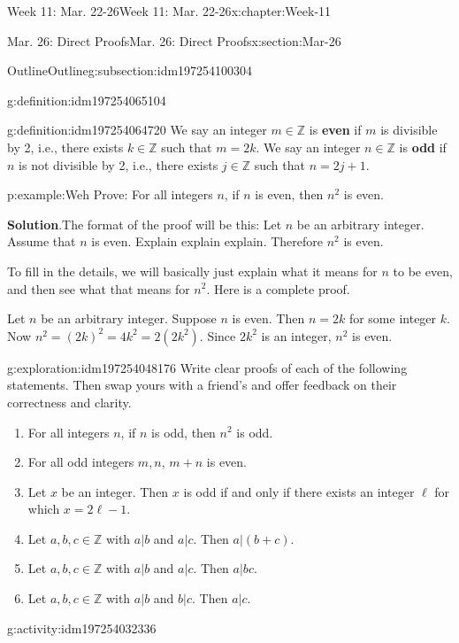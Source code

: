 \documentclass[oneside,10pt,]{book}
\newcommand{\blocktitlefont}{\relax}
\newcommand{\terminology}[1]{\textbf{#1}}
\numberwithin{equation}{section}
\def\Z{{\mathbb Z}}
\newcommand{\Z}{\mathbb Z}
\begin{document}
\begin{chapterptx}{Week 11: Mar. 22-26}{}{Week 11: Mar. 22-26}{}{}{x:chapter:Week-11}
\begin{sectionptx}{Mar. 26: Direct Proofs}{}{Mar. 26: Direct Proofs}{}{}{x:section:Mar-26}
\begin{subsectionptx}{Outline}{}{Outline}{}{}{g:subsection:idm197254100304}
\begin{definition}{}{g:definition:idm197254065104}
\end{definition}
\begin{definition}{}{g:definition:idm197254064720}%
We say an integer \(m\in\Z\) is \terminology{even} if \(m\) is divisible by 2, i.e., there exists \(k\in\Z\) such that \(m = 2k\). We say an integer \(n\in\Z\) is \terminology{odd} if \(n\) is not divisible by 2, i.e., there exists \(j\in\Z\) such that \(n = 2j+1\).%
\end{definition}
\begin{example}{}{p:example:Weh}%
Prove: For all integers \(n\), if \(n\) is even, then \(n^2\) is even.%
\par\smallskip%
\noindent\textbf{\blocktitlefont Solution}.\hypertarget{p:solution:EaD}{}\quad{}The format of the proof will be this: Let \(n\) be an arbitrary integer. Assume that \(n\) is even. Explain explain explain. Therefore \(n^2\) is even.%
\par
To fill in the details, we will basically just explain what it means for \(n\) to be even, and then see what that means for \(n^2\). Here is a complete proof.%
\begin{solutionproof}
Let \(n\) be an arbitrary integer. Suppose \(n\) is even. Then \(n = 2k\) for some integer \(k\). Now \(n^2 = (2k)^2 = 4k^2 = 2(2k^2)\). Since \(2k^2\) is an integer, \(n^2\) is even.%
\end{solutionproof}
\end{example}
\begin{exploration}{}{g:exploration:idm197254048176}%
Write clear proofs of each of the following statements. Then swap yours with a friend's and offer feedback on their correctness and clarity.%
%
\begin{enumerate}
\item{}For all integers \(n\), if \(n\) is odd, then \(n^2\) is odd.%
\item{}For all odd integers \(m,n\), \(m+n\) is even.%
\item{}Let \(x\) be an integer. Then \(x\) is odd if and only if there exists an integer \(\ell\) for which \(x = 2\ell -1\).%
\item{}Let \(a,b,c\in\Z\) with \(a|b\) and \(a|c\). Then \(a|(b+c)\).%
\item{}Let \(a,b,c\in\Z\) with \(a|b\) and \(a|c\). Then \(a|bc\).%
\item{}Let \(a,b,c\in\Z\) with \(a|b\) and \(b|c\). Then \(a|c\).%
\end{enumerate}
\end{exploration}%
\begin{activity}{}{g:activity:idm197254032336}%

\end{activity}
\end{subsectionptx}
\end{sectionptx}
\end{chapterptx}
\end{document}
